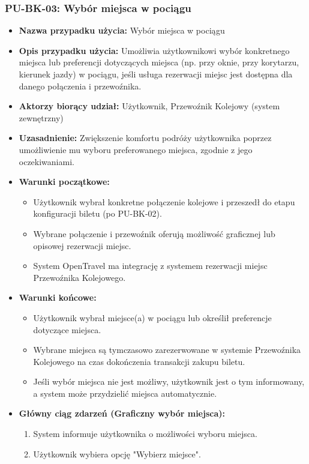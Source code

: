 \documentclass[a4paper,12pt]{article}
\begin{document}
\subsubsection{PU-BK-03: Wybór miejsca w pociągu}
\begin{itemize}
\item \textbf{Nazwa przypadku użycia:} Wybór miejsca w pociągu
\item \textbf{Opis przypadku użycia:} Umożliwia użytkownikowi wybór konkretnego miejsca lub preferencji dotyczących miejsca (np. przy oknie, przy korytarzu, kierunek jazdy) w pociągu, jeśli usługa rezerwacji miejsc jest dostępna dla danego połączenia i przewoźnika.
\item \textbf{Aktorzy biorący udział:} Użytkownik, Przewoźnik Kolejowy (system zewnętrzny)
\item \textbf{Uzasadnienie:} Zwiększenie komfortu podróży użytkownika poprzez umożliwienie mu wyboru preferowanego miejsca, zgodnie z jego oczekiwaniami.
\item \textbf{Warunki początkowe:}
\begin{itemize}
\item Użytkownik wybrał konkretne połączenie kolejowe i przeszedł do etapu konfiguracji biletu (po PU-BK-02).
\item Wybrane połączenie i przewoźnik oferują możliwość graficznej lub opisowej rezerwacji miejsc.
\item System OpenTravel ma integrację z systemem rezerwacji miejsc Przewoźnika Kolejowego.
\end{itemize}
\item \textbf{Warunki końcowe:}
\begin{itemize}
\item Użytkownik wybrał miejsce(a) w pociągu lub określił preferencje dotyczące miejsca.
\item Wybrane miejsca są tymczasowo zarezerwowane w systemie Przewoźnika Kolejowego na czas dokończenia transakcji zakupu biletu.
\item Jeśli wybór miejsca nie jest możliwy, użytkownik jest o tym informowany, a system może przydzielić miejsca automatycznie.
\end{itemize}
\item \textbf{Główny ciąg zdarzeń (Graficzny wybór miejsca):}
\begin{enumerate}
\item System informuje użytkownika o możliwości wyboru miejsca.
\item Użytkownik wybiera opcję "Wybierz miejsce".

\end{enumerate}
\end{itemize}
\end{document}
